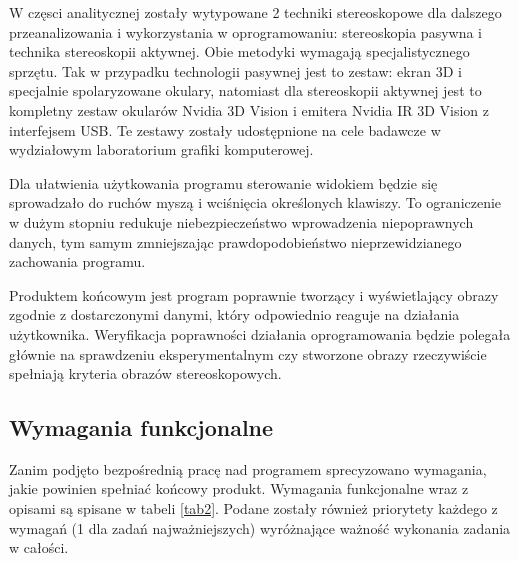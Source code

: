W częsci analitycznej zostały wytypowane 2 techniki stereoskopowe dla dalszego przeanalizowania i wykorzystania w oprogramowaniu: stereoskopia pasywna i technika stereoskopii aktywnej. Obie metodyki wymagają specjalistycznego sprzętu. Tak w przypadku technologii pasywnej jest to zestaw: ekran 3D i specjalnie spolaryzowane okulary, natomiast dla stereoskopii aktywnej jest to kompletny zestaw okularów Nvidia 3D Vision i emitera Nvidia IR 3D Vision z interfejsem USB. Te zestawy zostały udostępnione na cele badawcze w wydziałowym laboratorium grafiki komputerowej.

Dla ułatwienia użytkowania programu sterowanie widokiem będzie się sprowadzało do ruchów myszą i wciśnięcia określonych klawiszy. To ograniczenie w dużym stopniu redukuje niebezpieczeństwo wprowadzenia niepoprawnych danych, tym samym zmniejszając prawdopodobieństwo nieprzewidzianego zachowania programu.

Produktem końcowym jest program poprawnie tworzący i wyświetlający obrazy zgodnie z dostarczonymi danymi, który odpowiednio reaguje na działania użytkownika. Weryfikacja poprawności działania oprogramowania będzie polegała głównie na sprawdzeniu eksperymentalnym czy stworzone obrazy rzeczywiście spełniają kryteria obrazów stereoskopowych. 

\subsection{Wymagania funkcjonalne}
Zanim podjęto bezpośrednią pracę nad programem sprecyzowano wymagania, jakie powinien spełniać końcowy produkt. Wymagania funkcjonalne wraz z opisami są spisane w tabeli \ref{tab2}. Podane zostały również priorytety każdego z wymagań (1 dla zadań najważniejszych) wyróżnające ważność wykonania zadania w całości. 

